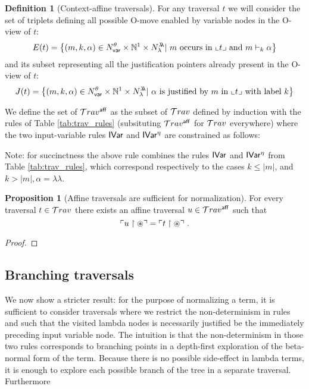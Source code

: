 \documentclass{article}
\theoremstyle{definition}
\newtheorem{definition}{Definition}[section]
\newtheorem{proposition}{Proposition}[section]
\newcommand\Nodes{N}%
\newcommand\NodesVar{N_{\sf var}}%
\newcommand\NodesLmd{N_\lambda}%
\newcommand{\ghostlmd}{{\lambda\!\!\lambda}}
\newcommand{\ghostvar}{\theta}
\newcommand{\affine}{{\sf aff}}
\newcommand{\travsetaffine}{{\travset^\affine}}
\newcommand{\NodeHjByRoot}{\Nodes^{\filter\theroot}}
\newcommand{\rulefont}[1]{\mathbf{\sf #1}}
\newcommand{\enables}{\vdash}
\begin{document}
\begin{definition}[Context-affine traversals]
For any traversal $t$ we will consider the set of triplets defining all possible O-move enabled by variable nodes in the O-view of $t$:
$$ E(t) = \left\{ (m, k, \alpha) \in \NodesVar^\ghostvar\times\nat^1\times \NodesLmd^\ghostlmd |\ \mbox{$m$ occurs in $\oview{t}$ and $m\enables_k\alpha$} \right\}
$$
and its subset representing all the justification pointers already present in the O-view of $t$:
$$ J(t) = \left\{ (m, k, \alpha) \in \NodesVar^\ghostvar\times\nat^1\times \NodesLmd^\ghostlmd
|\ \mbox{$\alpha$ is justified by $m$ in $\oview{t}$ with label $k$} \right\}
$$

We define the set of  $\travsetaffine$ as the subset of $\mathcal{T}rav$ defined by induction with the rules of Table \ref{tab:trav_rules} (subsituting $\travsetaffine$ for $\mathcal{T}rav$ everywhere) where the two input-variable rules $\rulefont{IVar}$ and $\rulefont{IVar^\eta}$ are constrained as follows:

\infrule[$\rulefont{IVar}_\affine$]
     {
            t = t_1 \cdot m \cdot t_2 \in \travsetaffine
            \andalso t^\omega \in \NodeHjByRoot \inter \NodesVar
            \andalso (m,k,\alpha) \in E(t) \setminus J(t)
            \andalso k \geq 1
     }
     { \in \travsetaffine}

Note: for succinctness the above rule combines the rules
$\rulefont{IVar}$ and $\rulefont{IVar^\eta}$ from Table \ref{tab:trav_rules},
 which correspond respectively to the cases $k\leq |m|$, and $k>|m|, \alpha = \ghostlmd$.
\end{definition}


\begin{proposition}[Affine traversals are sufficient for normalization]
For every traversal $t\in\mathcal{T}rav$ there exists an affine traversal $u \in \travsetaffine$ such that
$$\ulcorner u\upharpoonright\circledast \urcorner = \ulcorner t\upharpoonright\circledast \urcorner \ .$$
\end{proposition}
\begin{proof}
\end{proof}


\subsection{Branching traversals}
We now show a stricter result: for the purpose of normalizing a term, it is sufficient to consider traversals where we restrict the non-determinism in rules  and  such that the visited lambda nodes is necessarily justified be the immediately preceding input variable node.
The intuition is that the non-determinism in those two rules corresponds to branching points in a depth-first exploration of the beta-normal form of the term. Because there is no possible side-effect in lambda terms, it is enough to explore each possible branch of the tree in a separate traversal.
Furthermore
\end{document}
